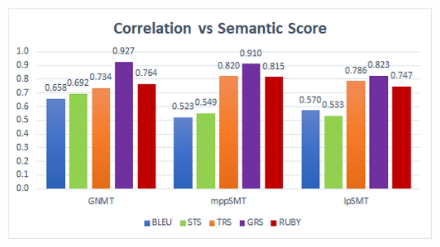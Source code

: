 \begin{figure}
\centering
\includegraphics[scale=0.85]{img/summary.jpg}
\label{fig:summary}
\end{figure}